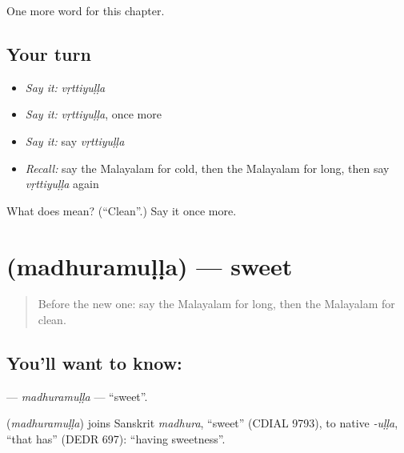 \begin{grammarlens}[title={What you've built}]
One more word for this chapter.
\end{grammarlens}

\subsection*{Your turn}
\begin{itemize}
\raggedright
  \item \emph{Say it:} \emph{vṛttiyuḷḷa}
  \item \emph{Say it:} \emph{vṛttiyuḷḷa}, once more
  \item \emph{Say it:} say \emph{vṛttiyuḷḷa}
  \item \emph{Recall:} say the Malayalam for cold, then the Malayalam for long, then say \emph{vṛttiyuḷḷa} again
\end{itemize}

\begin{tcolorbox}[breakable,colback=teal!4,colframe=teal!35!black,title={Before you move on}]
What does  mean? (\textquotedblleft{}Clean\textquotedblright{}.) Say it once more.
\end{tcolorbox}
\section[\texorpdfstring{\ml{മധുരമുള്ള} (madhuramuḷḷa)}{മധുരമുള്ള (madhuramuḷḷa)}]{ (madhuramuḷḷa) — sweet}

\label{lesson:ML-C165-madhuramulla}



\begin{quote}
Before the new one: say the Malayalam for long, then the Malayalam for clean.
\end{quote}

\subsection*{You'll want to know: }
\textbf{} — \emph{madhuramuḷḷa} — \textquotedblleft{}sweet\textquotedblright{}.

\begin{cousinweb}
\textbf{} (\emph{madhuramuḷḷa}) joins Sanskrit \emph{madhura}, \textquotedblleft{}sweet\textquotedblright{} (CDIAL 9793), to native \emph{-uḷḷa}, \textquotedblleft{}that has\textquotedblright{} (DEDR 697): \textquotedblleft{}having sweetness\textquotedblright{}.
\end{cousinweb}

